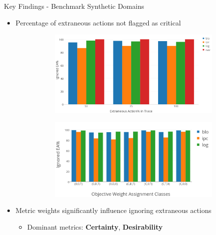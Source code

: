\begin{frame}{Key Findings - Benchmark Synthetic Domains}

\begin{itemize}
\item Percentage of extraneous actions not flagged as critical

\begin{figure}
     \centering
     \begin{subfigure}[b]{0.5\columnwidth}
         \centering
                  \includegraphics[width=\textwidth]{../img/ignoredea.png}
     \end{subfigure}
     \begin{subfigure}[b]{0.5\columnwidth}
         \centering
                  \includegraphics[width=\textwidth]{../img/ow.png}
     \end{subfigure}
\end{figure}

\item Metric weights significantly influence ignoring extraneous actions
\begin{itemize}
\item Dominant metrics: \textbf{Certainty}, \textbf{Desirability}
\end{itemize}
\end{itemize}

\end{frame}


